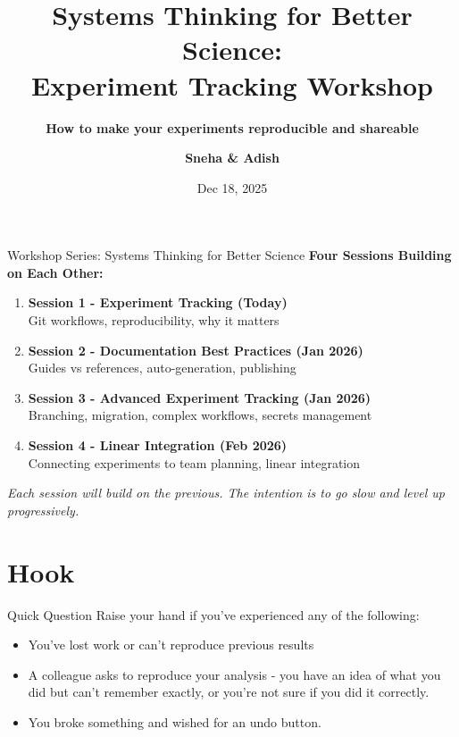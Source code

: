 \documentclass{beamer}
\title[Systems Thinking Workshop Series \#1: Experiment Tracking]{Systems Thinking for Better Science: \\ \textbf{Experiment Tracking Workshop}}
\subtitle{\textbf{How to make your experiments reproducible and shareable}}
\author[Sneha \& Adish]{\textbf{Sneha \& Adish}}
\date[Dec 18, 2025]{Dec 18, 2025}
\begin{document}
\maketitle

\begin{frame}{Workshop Series: Systems Thinking for Better Science}
    \textbf{Four Sessions Building on Each Other:}
    
    \vspace{0.5em}
    \begin{enumerate}
        \item \textbf{Session 1 - Experiment Tracking (Today)} \\
        {\small Git workflows, reproducibility, why it matters}
        
        \item \textbf{Session 2 - Documentation Best Practices (Jan 2026)} \\
        {\small Guides vs references, auto-generation, publishing}
        
        \item \textbf{Session 3 - Advanced Experiment Tracking (Jan 2026)} \\
        {\small Branching, migration, complex workflows, secrets management}
        
        \item \textbf{Session 4 - Linear Integration (Feb 2026)} \\
        {\small Connecting experiments to team planning, linear integration}
    \end{enumerate}
    
    \vspace{0.5em}
    \textit{Each session will build on the previous. The intention is to go slow and level up progressively.}
\end{frame}


\section{Hook}



\begin{frame}{Quick Question}
\Large
Raise your hand if you've experienced any of the following:
\vspace{1em}

\begin{itemize}
    \item You've lost work or can't reproduce previous results
    \pause
    \item A colleague asks to reproduce your analysis - you have an idea of what you did but can't remember exactly, or you're not sure if you did it correctly.
    \pause
    \item You broke something and wished for an undo button.
\end{itemize}
\end{frame}
\end{document}
